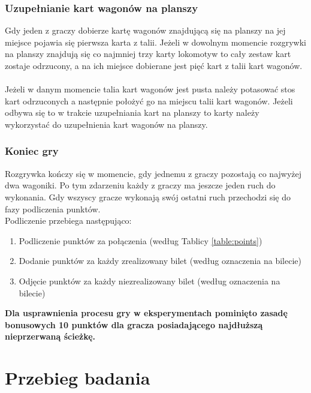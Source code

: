 \documentclass[12pt, oneside]{report}
\begin{document}
	\subsection{Uzupełnianie kart wagonów na planszy}
	Gdy jeden z graczy dobierze kartę wagonów znajdującą się na planszy na jej miejsce pojawia się pierwsza karta z talii. Jeżeli w dowolnym momencie rozgrywki na planszy znajdują się co najmniej trzy karty lokomotyw to cały zestaw kart zostaje odrzucony, a na ich miejsce dobierane jest pięć kart z talii kart wagonów. \\ \\
	Jeżeli w danym momencie talia kart wagonów jest pusta należy potasować stos kart odrzuconych a następnie położyć go na miejscu talii kart wagonów. Jeżeli odbywa się to w trakcie uzupełniania kart na planszy to karty należy wykorzystać do uzupełnienia kart wagonów na planszy. 
	\subsection{Koniec gry}
	Rozgrywka kończy się w momencie, gdy jednemu z graczy pozostają co najwyżej dwa wagoniki. Po tym zdarzeniu każdy z graczy ma jeszcze jeden ruch do wykonania. Gdy wszyscy gracze wykonają swój ostatni ruch przechodzi się do fazy podliczenia punktów. \\
	Podliczenie przebiega następująco:
	\begin{enumerate}
		\item Podliczenie punktów za połączenia (według Tablicy \ref{table:points})
		\item Dodanie punktów za każdy zrealizowany bilet (według oznaczenia na bilecie)
		\item Odjęcie punktów za każdy niezrealizowany bilet (według oznaczenia na bilecie)
	\end{enumerate}
	\textbf{Dla usprawnienia procesu gry w eksperymentach pominięto zasadę bonusowych 10 punktów dla gracza posiadającego najdłuższą nieprzerwaną ścieżkę.}
	\chapter{Przebieg badania}
\end{document}
